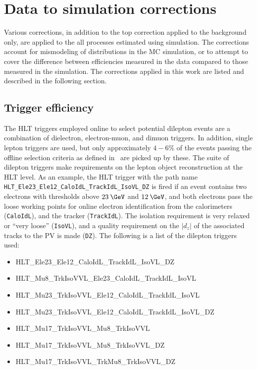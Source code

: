 \section{Data to simulation corrections}

Various corrections, in addition to the top \pt correction applied to the \ttll background only, are applied to the all processes estimated using simulation. The corrections account for mismodeling of distributions in the MC simulation, or to attempt to cover the difference between efficiencies measured in the data compared to those measured in the simulation. The corrections applied in this work are listed and described in the following section.

\subsection{Trigger efficiency}
\label{subsec:trigger}
The HLT triggers employed online to select potential dilepton events are a combination of dielectron, electron-muon, and dimuon triggers. In addition, single lepton triggers are used, but only approximately $4-6\%$ of the events passing the offline selection criteria as defined in~ are picked up by these. The suite of dilepton triggers make requirements on the lepton object reconstruction at the HLT level. As an example, the HLT trigger with the path name \texttt{HLT\_Ele23\_Ele12\_CaloIdL\_TrackIdL\_IsoVL\_DZ} is fired if an event contains two electrons with \pt thresholds above $23\:\GeV$ and $12\:\GeV$, and both electrons pass the loose working points for online electron identification from the calorimeters (\texttt{CaloIdL}), and the tracker (\texttt{TrackIdL}). The isolation requirement is very relaxed or ``very loose'' (\texttt{IsoVL}), and a quality requirement on the $|{d_{z}}|$ of the associated tracks to the PV is made (\texttt{DZ}). The following is a list of the dilepton triggers used:

\begin{itemize}
\item HLT\_Ele23\_Ele12\_CaloIdL\_TrackIdL\_IsoVL\_DZ
\item HLT\_Mu8\_TrkIsoVVL\_Ele23\_CaloIdL\_TrackIdL\_IsoVL
\item HLT\_Mu23\_TrkIsoVVL\_Ele12\_CaloIdL\_TrackIdL\_IsoVL
\item HLT\_Mu23\_TrkIsoVVL\_Ele12\_CaloIdL\_TrackIdL\_IsoVL\_DZ
\item HLT\_Mu17\_TrkIsoVVL\_Mu8\_TrkIsoVVL
\item HLT\_Mu17\_TrkIsoVVL\_Mu8\_TrkIsoVVL\_DZ
\item HLT\_Mu17\_TrkIsoVVL\_TrkMu8\_TrkIsoVVL\_DZ
\end{itemize}
 
